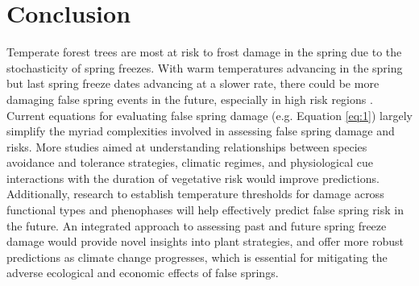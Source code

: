 \documentclass{article}\usepackage[]{graphicx}\usepackage[]{color}
\begin{document}

\section{Conclusion}
Temperate forest trees are most at risk to frost damage in the spring due to the stochasticity of spring freezes. With warm temperatures advancing in the spring but last spring freeze dates advancing at a slower rate, there could be more damaging false spring events in the future, especially in high risk regions \citep{Gu2008, Inouye2008, Liu2018}. Current equations for evaluating false spring damage (e.g. Equation \ref{eq:1}) largely simplify the myriad complexities involved in assessing false spring damage and risks. More studies aimed at understanding relationships between species avoidance and tolerance strategies, climatic regimes, and physiological cue interactions with the duration of vegetative risk would improve predictions. Additionally, research to establish temperature thresholds for damage across functional types and phenophases will help effectively predict false spring risk in the future. An integrated approach to assessing past and future spring freeze damage would provide novel insights into plant strategies, and offer more robust predictions as climate change progresses, which is essential for mitigating the adverse ecological and economic effects of false springs.

\nocite{Soudani2012}
\nocite{White2009}
\nocite{Schaber2005}
\nocite{Schwartz1993}
\nocite{Barker2005}
\nocite{Sanchez2013}
\nocite{Longstroth2012}
\nocite{Barlow2015}
\nocite{Longstroth2013}
\nocite{Charrier2011}

\end{document}
